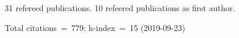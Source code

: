 31 refereed publications. 10 refeered publications as first author.

Total citations~=~779; h-index~=~15 (2019-09-23)
